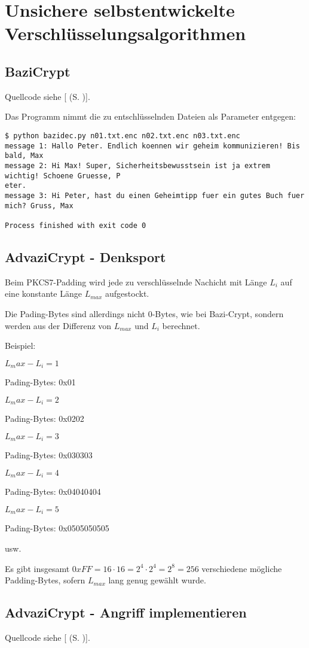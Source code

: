 \documentclass[twoside]{article}
\newcommand{\mref}[1]{[\nameref{#1} (S. \pageref{#1})]}
\begin{document}
\section{Unsichere selbstentwickelte Verschlüsselungsalgorithmen}
	\label{sec:encrypt}
	\subsection{BaziCrypt}
		\label{ssec:bazi}
		Quellcode siehe \mref{bazicrypt}.
		
		Das Programm nimmt die zu entschlüsselnden Dateien als Parameter entgegen:
		\begin{verbatim}
$ python bazidec.py n01.txt.enc n02.txt.enc n03.txt.enc
message 1: Hallo Peter. Endlich koennen wir geheim kommunizieren! Bis bald, Max
message 2: Hi Max! Super, Sicherheitsbewusstsein ist ja extrem wichtig! Schoene Gruesse, P
eter.
message 3: Hi Peter, hast du einen Geheimtipp fuer ein gutes Buch fuer mich? Gruss, Max

Process finished with exit code 0
		\end{verbatim}
	\subsection{AdvaziCrypt - Denksport}
		\label{ssec:advazi}
Beim PKCS7-Padding wird jede zu verschlüsselnde Nachicht mit Länge $L_i$ auf eine konstante Länge $L_{max}$ aufgestockt.

Die Pading-Bytes sind allerdings nicht 0-Bytes, wie bei Bazi-Crypt, sondern werden aus der Differenz von $L_{max}$ und $L_i$ berechnet.

Beispiel:

$L_max - L_i = 1$

Pading-Bytes: 0x01

$L_max - L_i = 2$

Pading-Bytes: 0x0202

$L_max - L_i = 3$

Pading-Bytes: 0x030303

$L_max - L_i = 4$

Pading-Bytes: 0x04040404

$L_max - L_i = 5$

Pading-Bytes: 0x0505050505

usw.

Es gibt insgesamt $0xFF = 16 \cdot 16 = 2^4 \cdot 2^4 = 2^8 = 256$ verschiedene mögliche Padding-Bytes, sofern $L_{max}$ lang genug gewählt wurde.

	\subsection{AdvaziCrypt - Angriff implementieren}
		\label{ssec:advazi2}
		Quellcode siehe \mref{advazicrypt}.
		
\end{document}
